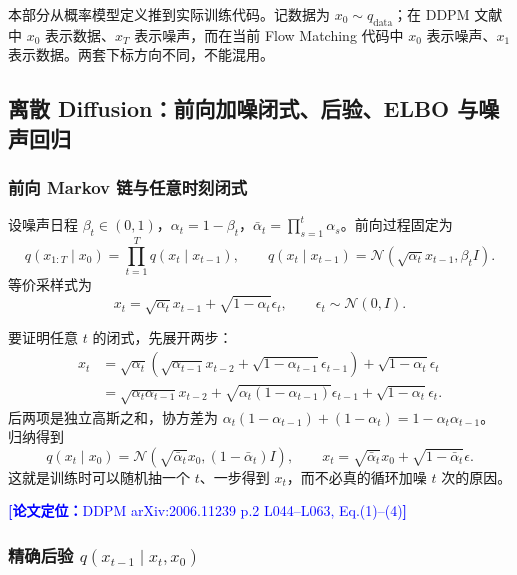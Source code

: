 \documentclass[11pt,a4paper]{ctexart}
\newcommand{\paperref}[1]{\textcolor{Blue}{\footnotesize\textbf{[论文定位：}#1\textbf{]}}}
\newcommand{\N}{\mathcal{N}}
\begin{document}
本部分从概率模型定义推到实际训练代码。记数据为 $x_0\sim q_{\mathrm{data}}$；在 DDPM 文献中 $x_0$ 表示数据、$x_T$ 表示噪声，而在当前 Flow Matching 代码中 $x_0$ 表示噪声、$x_1$ 表示数据。两套下标方向不同，不能混用。

\subsection{离散 Diffusion：前向加噪闭式、后验、ELBO 与噪声回归}

\subsubsection*{前向 Markov 链与任意时刻闭式}

设噪声日程 $\beta_t\in(0,1)$，$\alpha_t=1-\beta_t$，$\bar\alpha_t=\prod_{s=1}^t\alpha_s$。前向过程固定为
\begin{equation}
q(x_{1:T}\mid x_0)=\prod_{t=1}^T q(x_t\mid x_{t-1}),\qquad
q(x_t\mid x_{t-1})=\N(\sqrt{\alpha_t}x_{t-1},\beta_t I).
\end{equation}
等价采样式为
\begin{equation}
x_t=\sqrt{\alpha_t}x_{t-1}+\sqrt{1-\alpha_t}\epsilon_t,\qquad\epsilon_t\sim\N(0,I).
\end{equation}

要证明任意 $t$ 的闭式，先展开两步：
\begin{align}
x_t
&=\sqrt{\alpha_t}\left(\sqrt{\alpha_{t-1}}x_{t-2}+\sqrt{1-\alpha_{t-1}}\epsilon_{t-1}\right)
+\sqrt{1-\alpha_t}\epsilon_t\\
&=\sqrt{\alpha_t\alpha_{t-1}}x_{t-2}
+\sqrt{\alpha_t(1-\alpha_{t-1})}\epsilon_{t-1}
+\sqrt{1-\alpha_t}\epsilon_t.
\end{align}
后两项是独立高斯之和，协方差为
$\alpha_t(1-\alpha_{t-1})+(1-\alpha_t)=1-\alpha_t\alpha_{t-1}$。
归纳得到
\begin{equation}
q(x_t\mid x_0)=\N(\sqrt{\bar\alpha_t}x_0,(1-\bar\alpha_t)I),
\qquad x_t=\sqrt{\bar\alpha_t}x_0+\sqrt{1-\bar\alpha_t}\epsilon.
\label{eq:ddpmclosed}
\end{equation}
这就是训练时可以随机抽一个 $t$、一步得到 $x_t$，而不必真的循环加噪 $t$ 次的原因。

\paperref{DDPM arXiv:2006.11239 p.2 L044--L063, Eq.(1)--(4)}

\subsubsection*{精确后验 $q(x_{t-1}\mid x_t,x_0)$}
\end{document}

